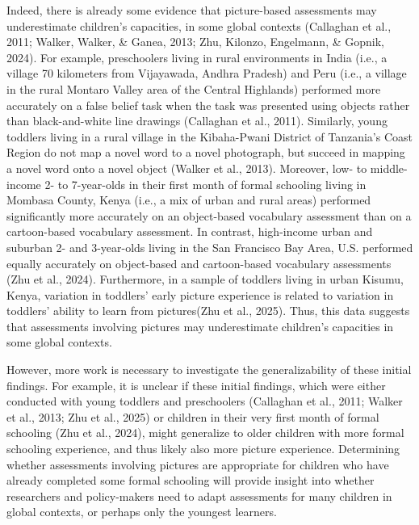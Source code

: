 \documentclass[10pt, letterpaper]{article}
\begin{document}
Indeed, there is already some evidence that picture-based assessments
may underestimate children's capacities, in some global contexts
(Callaghan et al., 2011; Walker, Walker, \& Ganea, 2013; Zhu, Kilonzo,
Engelmann, \& Gopnik, 2024). For example, preschoolers living in rural
environments in India (i.e., a village 70 kilometers from Vijayawada,
Andhra Pradesh) and Peru (i.e., a village in the rural Montaro Valley
area of the Central Highlands) performed more accurately on a false
belief task when the task was presented using objects rather than
black-and-white line drawings (Callaghan et al., 2011). Similarly, young
toddlers living in a rural village in the Kibaha-Pwani District of
Tanzania's Coast Region do not map a novel word to a novel photograph,
but succeed in mapping a novel word onto a novel object (Walker et al.,
2013). Moreover, low- to middle-income 2- to 7-year-olds in their first
month of formal schooling living in Mombasa County, Kenya (i.e., a mix
of urban and rural areas) performed significantly more accurately on an
object-based vocabulary assessment than on a cartoon-based vocabulary
assessment. In contrast, high-income urban and suburban 2- and
3-year-olds living in the San Francisco Bay Area, U.S. performed equally
accurately on object-based and cartoon-based vocabulary assessments (Zhu
et al., 2024). Furthermore, in a sample of toddlers living in urban
Kisumu, Kenya, variation in toddlers' early picture experience is
related to variation in toddlers' ability to learn from pictures(Zhu et
al., 2025). Thus, this data suggests that assessments involving pictures
may underestimate children's capacities in some global contexts.

However, more work is necessary to investigate the generalizability of
these initial findings. For example, it is unclear if these initial
findings, which were either conducted with young toddlers and
preschoolers (Callaghan et al., 2011; Walker et al., 2013; Zhu et al.,
2025) or children in their very first month of formal schooling (Zhu et
al., 2024), might generalize to older children with more formal
schooling experience, and thus likely also more picture experience.
Determining whether assessments involving pictures are appropriate for
children who have already completed some formal schooling will provide
insight into whether researchers and policy-makers need to adapt
assessments for many children in global contexts, or perhaps only the
youngest learners.
\end{document}

